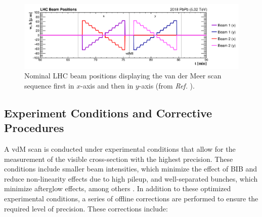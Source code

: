 \begin{figure}[!htb]
	\centering
	\includegraphics[width=\textwidth]{images/assets/vdm_scan_steps.png}
	\caption[Example vdM scan sequence positions]{Nominal LHC beam positions displaying the van der Meer scan sequence first in $x$-axis and then in $y$-axis (from \textit{Ref.} \cite{Saariokari:2826125}).}
	\label{fig:vdm_scan_steps}
\end{figure}

\subsection{Experiment Conditions and Corrective Procedures}
\label{sec:experiment_conditions_and_corrective_procedures}

A vdM scan is conducted under experimental conditions that allow for the measurement of the visible cross-section with the highest precision. These conditions include smaller beam intensities, which minimize the effect of BIB and reduce non-linearity effects due to high pileup, and well-separated bunches, which minimize afterglow effects, among others \cite{GRAFSTROM201597}. In addition to these optimized experimental conditions, a series of offline corrections are performed to ensure the required level of precision. These corrections include:

